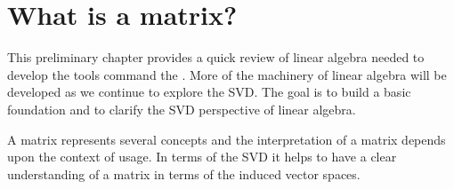 \setcounter{chapter}{-1}
\chapter{What is a matrix?}

This preliminary chapter provides a quick review of linear algebra needed to develop the tools command the \svdp. More of the machinery of linear algebra will be developed as we continue to explore the SVD. The goal is to build a basic foundation and to clarify the SVD perspective of linear algebra.

A matrix represents several concepts and the interpretation of a matrix depends upon the context of usage. In terms of the SVD it helps to have a clear understanding of a matrix in terms of the induced vector spaces.










\endinput